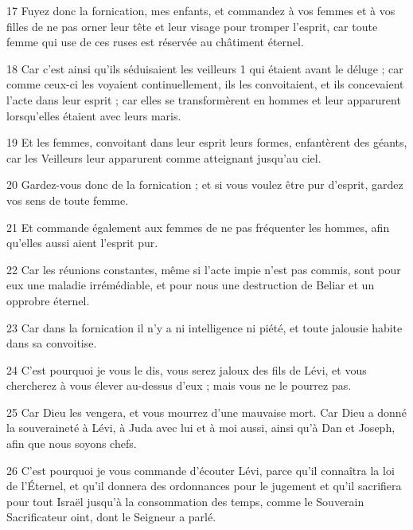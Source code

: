 \par 17 Fuyez donc la fornication, mes enfants, et commandez à vos femmes et à vos filles de ne pas orner leur tête et leur visage pour tromper l'esprit, car toute femme qui use de ces ruses est réservée au châtiment éternel.

\par 18 Car c'est ainsi qu'ils séduisaient les veilleurs 1 qui étaient avant le déluge ; car comme ceux-ci les voyaient continuellement, ils les convoitaient, et ils concevaient l'acte dans leur esprit ; car elles se transformèrent en hommes et leur apparurent lorsqu'elles étaient avec leurs maris.

\par 19 Et les femmes, convoitant dans leur esprit leurs formes, enfantèrent des géants, car les Veilleurs leur apparurent comme atteignant jusqu'au ciel.

\par 20 Gardez-vous donc de la fornication ; et si vous voulez être pur d'esprit, gardez vos sens de toute femme.

\par 21 Et commande également aux femmes de ne pas fréquenter les hommes, afin qu'elles aussi aient l'esprit pur.

\par 22 Car les réunions constantes, même si l'acte impie n'est pas commis, sont pour eux une maladie irrémédiable, et pour nous une destruction de Beliar et un opprobre éternel.

\par 23 Car dans la fornication il n'y a ni intelligence ni piété, et toute jalousie habite dans sa convoitise.

\par 24 C'est pourquoi je vous le dis, vous serez jaloux des fils de Lévi, et vous chercherez à vous élever au-dessus d'eux ; mais vous ne le pourrez pas.

\par 25 Car Dieu les vengera, et vous mourrez d'une mauvaise mort. Car Dieu a donné la souveraineté à Lévi, à Juda avec lui et à moi aussi, ainsi qu'à Dan et Joseph, afin que nous soyons chefs.

\par 26 C'est pourquoi je vous commande d'écouter Lévi, parce qu'il connaîtra la loi de l'Éternel, et qu'il donnera des ordonnances pour le jugement et qu'il sacrifiera pour tout Israël jusqu'à la consommation des temps, comme le Souverain Sacrificateur oint, dont le Seigneur a parlé.

